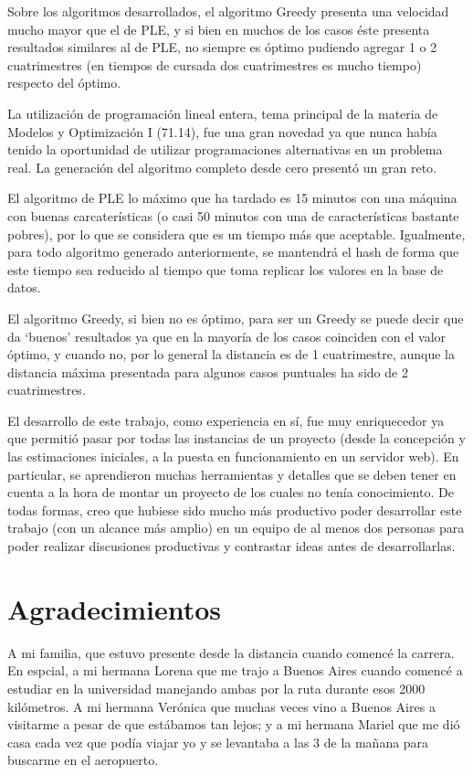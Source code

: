 \documentclass[a4paper]{article}
\begin{document}
Sobre los algoritmos desarrollados, el algoritmo Greedy presenta una velocidad mucho mayor que el de PLE, y si bien en muchos de los casos éste presenta resultados similares al de PLE, no siempre es óptimo pudiendo agregar 1 o 2 cuatrimestres (en tiempos de cursada dos cuatrimestres es mucho tiempo) respecto del óptimo.

La utilización de programación lineal entera, tema principal de la materia de Modelos y Optimización I (71.14), fue una gran novedad ya que nunca había tenido la oportunidad de utilizar programaciones alternativas en un problema real. La generación del algoritmo completo desde cero presentó un gran reto.

El algoritmo de PLE lo máximo que ha tardado es 15 minutos con una máquina con buenas carcaterísticas (o casi 50 minutos con una de características bastante pobres), por lo que se considera que es un tiempo más que aceptable. Igualmente, para todo algoritmo generado anteriormente, se mantendrá el hash de forma que este tiempo sea reducido al tiempo que toma replicar los valores en la base de datos.

El algoritmo Greedy, si bien no es óptimo, para ser un Greedy se puede decir que da `buenos' resultados ya que en la mayoría de los casos coinciden con el valor óptimo, y cuando no, por lo general la distancia es de 1 cuatrimestre, aunque la distancia máxima presentada para algunos casos puntuales ha sido de 2 cuatrimestres.\newline

El desarrollo de este trabajo, como experiencia en sí, fue muy enriquecedor ya que permitió pasar por todas las instancias de un proyecto (desde la concepción y las estimaciones iniciales, a la puesta en funcionamiento en un servidor web). En particular, se aprendieron muchas herramientas y detalles que se deben tener en cuenta a la hora de montar un proyecto de los cuales no tenía conocimiento. De todas formas, creo que hubiese sido mucho más productivo poder desarrollar este trabajo (con un alcance más amplio) en un equipo de al menos dos personas para poder realizar discusiones productivas y contrastar ideas antes de desarrollarlas.

\newpage
\section{Agradecimientos}

A mi familia, que estuvo presente desde la distancia cuando comencé la carrera. En espcial, a mi hermana Lorena que me trajo a Buenos Aires cuando comencé a estudiar en la universidad manejando ambas por la ruta durante esos 2000 kilómetros. A mi hermana Verónica que muchas veces vino a Buenos Aires a visitarme a pesar de que estábamos tan lejos; y a mi hermana Mariel que me dió casa cada vez que podía viajar yo y se levantaba a las 3 de la mañana para buscarme en el aeropuerto.
\end{document}
